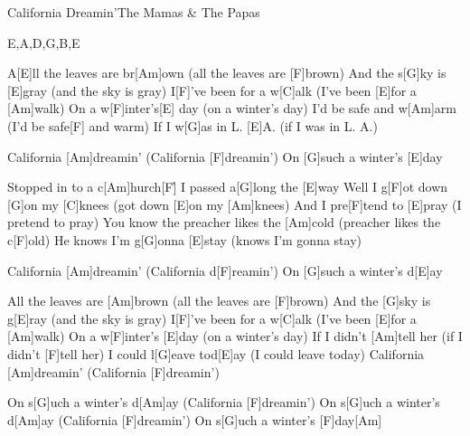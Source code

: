 \documentclass[../main.tex]{subfiles}
\begin{document}
\begin{song}[4]{California Dreamin'}{The Mamas \& The Papas}{}
\begin{tabline}{4}{6}{8}{E,A,D,G,B,E}
		\nextbar
		
		\nextbar
		
		\nextbar
		
		\nextbar
\end{tabline}

A[E]ll the leaves are br[Am]own  (all the leaves are [F]brown)
And the s[G]ky is [E]gray  (and the sky is gray)
I[F]'ve been for a w[C]alk (I've been [E]for a [Am]walk)
On a w[F]inter's[E] day  (on a winter's day)
I'd be safe and w[Am]arm  (I'd be safe[F] and warm)
If I w[G]as in L. [E]A.  (if I was in L. A.)

California [Am]dreamin' (California   [F]dreamin')
On [G]such a winter's [E]day

Stopped in to a c[Am]hurch[F]{\h}
I passed a[G]long the [E]way
Well I g[F]ot down [G]on my [C]knees (got down [E]on my [Am]knees)
And I pre[F]tend to [E]pray (I pretend to pray)
You know the preacher likes the [Am]cold   (preacher likes the c[F]old)
He knows I'm g[G]onna [E]stay (knows I'm gonna stay)

California [Am]dreamin' (California   d[F]reamin')
On [G]such a winter's d[E]ay

All the leaves are [Am]brown  (all the leaves are [F]brown)
And the [G]sky is g[E]ray (and the sky is gray)
I[F]'ve been for a w[C]alk  (I've been [E]for a [Am]walk)
On a w[F]inter's [E]day (on a winter's day)
If I didn't [Am]tell her (if I didn't  [F]tell her)
I could l[G]eave tod[E]ay (I could leave today)
California [Am]dreamin'  (California    [F]dreamin')

On s[G]uch a winter's d[Am]ay (California  [F]dreamin')
On s[G]uch a winter's d[Am]ay (California  [F]dreamin')
On s[G]uch a winter's [F]day[Am]

\end{song}
\end{document}
